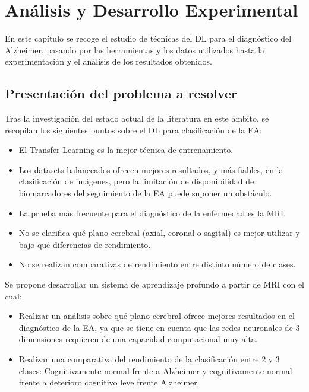\chapter{Análisis y Desarrollo Experimental}\label{ch:analisis-y-desarrollo-experimental}
En este capítulo se recoge el estudio de técnicas del DL para el diagnóstico del Alzheimer, pasando por las 
herramientas y los datos utilizados hasta la experimentación y el análisis de los resultados obtenidos.

\section{Presentación del problema a resolver}\label{sec:presentacion-del-problema-a-resolver}
Tras la investigación del estado actual de la literatura en este ámbito, se recopilan los siguientes puntos sobre el DL
para clasificación de la EA:

\begin{itemize}
    \item El Transfer Learning es la mejor técnica de entrenamiento.
    \item Los datasets balanceados ofrecen mejores resultados, y más fiables, en la clasificación de imágenes,
    pero la limitación de disponibilidad de biomarcadores del seguimiento de la EA puede suponer un obstáculo.
    \item La prueba más frecuente para el diagnóstico de la enfermedad es la MRI.
    \item No se clarifica qué plano cerebral (axial, coronal o sagital) es mejor utilizar y bajo qué diferencias de
    rendimiento.
    \item No se realizan comparativas de rendimiento entre distinto número de clases. \\
\end{itemize}

Se propone desarrollar un sistema de aprendizaje profundo a partir de MRI con el cual:

\begin{itemize}
    \item Realizar un análisis sobre qué plano cerebral ofrece mejores resultados en el diagnóstico de la EA, ya que se
    tiene en cuenta que las redes neuronales de 3 dimensiones requieren de una capacidad computacional muy alta.
    \item Realizar una comparativa del rendimiento de la clasificación entre 2 y 3 clases: Cognitivamente normal frente 
    a Alzheimer y cognitivamente normal frente a deterioro cognitivo leve frente Alzheimer.
\end{itemize}

